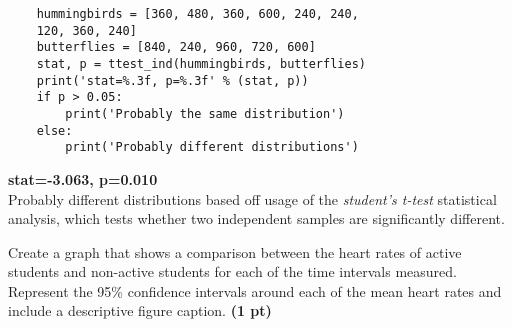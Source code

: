 \documentclass[12pt,a4paper]{article}
\begin{document}
\begin{enumerate}[font=\bfseries, wide, resume]
\begin{lstlisting}
    hummingbirds = [360, 480, 360, 600, 240, 240,
    120, 360, 240]
    butterflies = [840, 240, 960, 720, 600]
    stat, p = ttest_ind(hummingbirds, butterflies)
    print('stat=%.3f, p=%.3f' % (stat, p))
    if p > 0.05:
        print('Probably the same distribution')
    else:
        print('Probably different distributions')
    \end{lstlisting}
    
    \textbf{stat=-3.063, p=0.010}\\
    Probably different distributions based off usage of the \textit{student's t-test} statistical analysis, which tests whether two independent samples are significantly different. 

    {\color{under}\item Create a graph that shows a comparison between the heart rates of active students and non-active students for each of the time intervals measured.  Represent the 95\% confidence intervals around each of the mean heart rates and include a descriptive figure caption. \textbf{(1 pt)}}


\end{enumerate}
\end{document}
